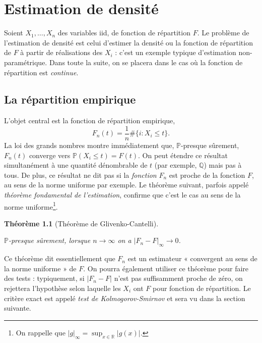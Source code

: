 \documentclass[
  10,
  letterpaper,
  DIV=11,
  numbers=noendperiod]{scrreport}
\theoremstyle{plain}
\newtheorem{theorem}{Théorème}[chapter]
\theoremstyle{definition}
\theoremstyle{plain}
\theoremstyle{definition}
\theoremstyle{definition}
\theoremstyle{plain}
\theoremstyle{remark}
\begin{document}
\hypertarget{estimation-de-densituxe9}{%
\chapter{Estimation de densité}\label{estimation-de-densituxe9}}

Soient \(X_1, \dotsc, X_n\) des variables iid, de fonction de
répartition \(F\). Le problème de l'estimation de densité est celui
d'estimer la densité ou la fonction de répartition de \(F\) à partir de
réalisations des \(X_i\) : c'est un exemple typique d'estimation
non-paramétrique. Dans toute la suite, on se placera dans le cas où la
fonction de répartition est \emph{continue}.

\hypertarget{la-ruxe9partition-empirique}{%
\section{La répartition empirique}\label{la-ruxe9partition-empirique}}

L'objet central est la fonction de répartition empirique,
\[ F_n(t) = \frac{1}{n}\#\{i : X_i \leqslant t\}.\] La loi des grands
nombres montre immédiatement que, \(\mathbb{P}\)-presque sûrement,
\(F_n(t)\) converge vers \(\mathbb{P}(X_i \leqslant t)=F(t)\). On peut
étendre ce résultat simultanément à une quantité dénombrable de \(t\)
(par exemple, \(\mathbb{Q}\)) mais pas à tous. De plus, ce résultat ne
dit pas si la \emph{fonction} \(F_n\) est proche de la fonction \(F\),
au sens de la norme uniforme par exemple. Le théorème suivant, parfois
appelé \emph{théorème fondamental de l'estimation}, confirme que c'est
le cas au sens de la norme uniforme\footnote{On rappelle que
  \(|g|_\infty = \sup_{x\in\mathbb{R}}|g(x)|\).}.

\begin{theorem}[Théorème de
Glivenko-Cantelli]\protect\hypertarget{thm-glivenko}{}\label{thm-glivenko}

\(\mathbb{P}\)-presque sûrement, lorsque \(n \to \infty\) on a
\(|F_n - F|_\infty \to 0\).

\end{theorem}

Ce théorème dit essentiellement que \(F_n\) est un estimateur «
convergent au sens de la norme uniforme » de \(F\). On pourra également
utiliser ce théorème pour faire des tests : typiquement, si
\(|F_n - F|\) n'est pas suffisamment proche de zéro, on rejettera
l'hypothèse selon laquelle les \(X_i\) ont \(F\) pour fonction de
répartition. Le critère exact est appelé \emph{test de
Kolmogorov-Smirnov} et sera vu dans la section suivante.
\end{document}

